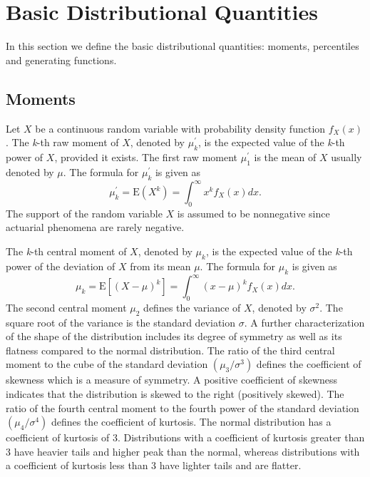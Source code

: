 \documentclass[]{book}
\theoremstyle{definition}
\theoremstyle{definition}
\theoremstyle{definition}
\theoremstyle{remark}
\begin{document}
\section{Basic Distributional Quantities}\label{S:BasicQuantities}

In this section we define the basic distributional quantities: moments,
percentiles and generating functions.

\subsection{Moments}\label{S:Chap3Moments}

Let \(X\) be a continuous random variable with probability density
function \(f_{X}\left( x \right)\). The \emph{k}-th raw moment of \(X\),
denoted by \(\mu_{k}^{\prime}\), is the expected value of the
\emph{k}-th power of \(X\), provided it exists. The first raw moment
\(\mu_{1}^{\prime}\) is the mean of \(X\) usually denoted by \(\mu\).
The formula for \(\mu_{k}^{\prime}\) is given as
\[\mu_{k}^{\prime} = \mathrm{E}\left( X^{k} \right) = \int_{0}^{\infty}{x^{k}f_{X}\left( x \right)dx } .\]
The support of the random variable \(X\) is assumed to be nonnegative
since actuarial phenomena are rarely negative.

The \emph{k}-th central moment of \(X\), denoted by \(\mu_{k}\), is the
expected value of the \emph{k}-th power of the deviation of \(X\) from
its mean \(\mu\). The formula for \(\mu_{k}\) is given as
\[\mu_{k} = \mathrm{E}\left\lbrack {(X - \mu)}^{k} \right\rbrack = \int_{0}^{\infty}{\left( x - \mu \right)^{k}f_{X}\left( x \right) dx }.\]
The second central moment \(\mu_{2}\) defines the variance of \(X\),
denoted by \(\sigma^{2}\). The square root of the variance is the
standard deviation \(\sigma\). A further characterization of the shape
of the distribution includes its degree of symmetry as well as its
flatness compared to the normal distribution. The ratio of the third
central moment to the cube of the standard deviation
\(\left( \mu_{3} / \sigma^{3} \right)\) defines the coefficient of
skewness which is a measure of symmetry. A positive coefficient of
skewness indicates that the distribution is skewed to the right
(positively skewed). The ratio of the fourth central moment to the
fourth power of the standard deviation
\(\left(\mu_{4} / \sigma^{4} \right)\) defines the coefficient of
kurtosis. The normal distribution has a coefficient of kurtosis of 3.
Distributions with a coefficient of kurtosis greater than 3 have heavier
tails and higher peak than the normal, whereas distributions with a
coefficient of kurtosis less than 3 have lighter tails and are flatter.
\end{document}
